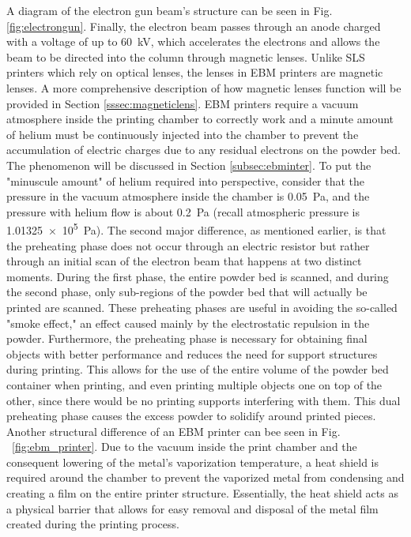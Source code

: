 A diagram of the electron gun beam's structure can be seen in Fig. \ref{fig:electrongun}. Finally, the electron beam passes through an anode charged with a voltage of up to \SI{60}{\kilo\volt}, which accelerates the electrons and allows the beam to be directed into the column through magnetic lenses. Unlike SLS printers which rely on optical lenses, the lenses in EBM printers are magnetic lenses. A more comprehensive description of how magnetic lenses function will be provided in Section \ref{sssec:magneticlens}. EBM printers require a vacuum atmosphere inside the printing chamber to correctly work and a minute amount of helium must be continuously injected into the chamber to prevent the accumulation of electric charges due to any residual electrons on the powder bed. The phenomenon will be discussed in Section \ref{subsec:ebminter}. To put the "minuscule amount" of helium required into perspective, consider that the pressure in the vacuum atmosphere inside the chamber is \SI{0.05}{\pascal}, and the pressure with helium flow is about \SI{0,2}{\pascal} (recall atmospheric pressure is \SI{1,01325e5}{\pascal}). The second major difference, as mentioned earlier, is that the preheating phase does not occur through an electric resistor but rather through an initial scan of the electron beam that happens at two distinct moments. During the first phase, the entire powder bed is scanned, and during the second phase, only sub-regions of the powder bed that will actually be printed are scanned. These preheating phases are useful in avoiding the so-called "smoke effect," an effect caused mainly by the electrostatic repulsion in the powder. Furthermore, the preheating phase is necessary for obtaining final objects with better performance and reduces the need for support structures during printing. This allows for the use of the entire volume of the powder bed container when printing, and even printing multiple objects one on top of the other, since there would be no printing supports interfering with them. This dual preheating phase causes the excess powder to solidify around printed pieces. Another structural difference of an EBM printer can bee seen in Fig. ~\ref{fig:ebm_printer}. Due to the vacuum inside the print chamber and the consequent lowering of the metal's vaporization temperature, a heat shield is required around the chamber to prevent the vaporized metal from condensing and creating a film on the entire printer structure. Essentially, the heat shield acts as a physical barrier that allows for easy removal and disposal of the metal film created during the printing process.
